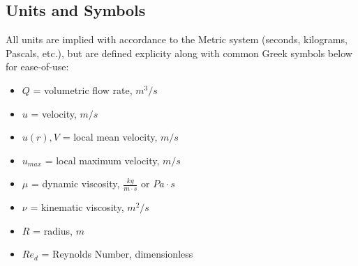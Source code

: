 \documentclass[11pt]{article} %
\numberwithin{equation}{section} %
\begin{document}
\subsection{Units and Symbols} \label{sec:units}
All units are implied with accordance to the Metric system (seconds, kilograms, Pascals, etc.), but are defined explicity along with common Greek symbols below for ease-of-use:
\begin{itemize}%
\item $Q$ = volumetric flow rate, $m^{3}/s$
\item $u$ = velocity, $m/s$ 
\item $u(r), V$ = local mean velocity, $m/s$ 
\item $u_{max}$ = local maximum velocity, $m/s$ 
\item $\mu$ = dynamic viscosity, $\frac{kg}{m \cdot s}$ or $Pa \cdot s$
\item $\nu$ = kinematic viscosity, $m^{2}/s$
\item $R$ = radius, $m$
\item $Re_{d}$ = Reynolds Number, dimensionless%

\end{itemize}
\printbibliography
\end{document}
